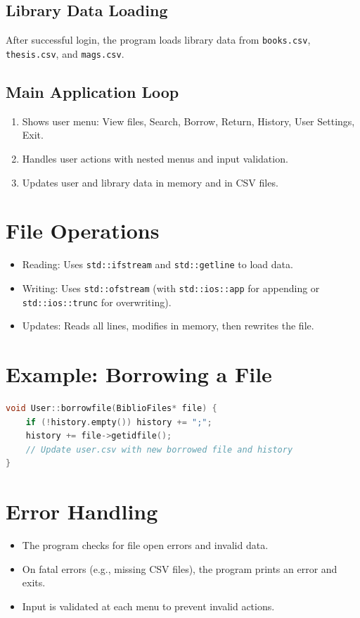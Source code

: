 \documentclass[a4paper,12pt]{article}
\begin{document}
\subsection{Library Data Loading}
After successful login, the program loads library data from \texttt{books.csv}, \texttt{thesis.csv}, and \texttt{mags.csv}.

\subsection{Main Application Loop}
\begin{enumerate}
    \item Shows user menu: View files, Search, Borrow, Return, History, User Settings, Exit.
    \item Handles user actions with nested menus and input validation.
    \item Updates user and library data in memory and in CSV files.
\end{enumerate}

\section{File Operations}
\begin{itemize}
    \item Reading: Uses \texttt{std::ifstream} and \texttt{std::getline} to load data.
    \item Writing: Uses \texttt{std::ofstream} (with \texttt{std::ios::app} for appending or \texttt{std::ios::trunc} for overwriting).
    \item Updates: Reads all lines, modifies in memory, then rewrites the file.
\end{itemize}

\section{Example: Borrowing a File}
\begin{lstlisting}[language=C++]
void User::borrowfile(BiblioFiles* file) {
    if (!history.empty()) history += ";";
    history += file->getidfile();
    // Update user.csv with new borrowed file and history
}
\end{lstlisting}

\section{Error Handling}
\begin{itemize}
    \item The program checks for file open errors and invalid data.
    \item On fatal errors (e.g., missing CSV files), the program prints an error and exits.
    \item Input is validated at each menu to prevent invalid actions.
\end{itemize}
\end{document}
